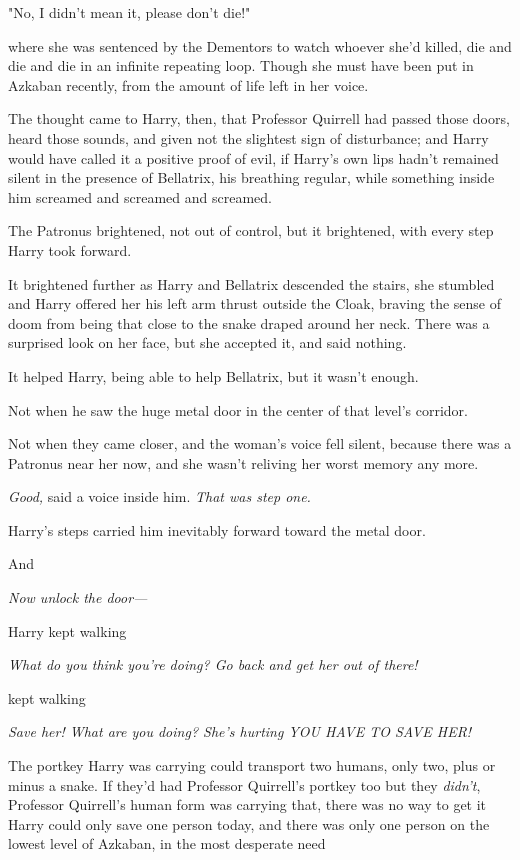 "No, I didn't mean it, please don't die!"

{\el} where she was sentenced by the Dementors to watch whoever she'd killed,
die and die and die in an infinite repeating loop. Though she must have been
put in Azkaban recently, from the amount of life left in her voice.

The thought came to Harry, then, that Professor Quirrell had passed those
doors, heard those sounds, and given not the slightest sign of disturbance; and
Harry would have called it a positive proof of evil, if Harry's own lips hadn't
remained silent in the presence of Bellatrix, his breathing regular, while
something inside him screamed and screamed and screamed.

The Patronus brightened, not out of control, but it brightened, with every step
Harry took forward.

It brightened further as Harry and Bellatrix descended the stairs, she stumbled
and Harry offered her his left arm thrust outside the Cloak, braving the sense
of doom from being that close to the snake draped around her neck. There was a
surprised look on her face, but she accepted it, and said nothing.

It helped Harry, being able to help Bellatrix, but it wasn't enough.

Not when he saw the huge metal door in the center of that level's corridor.

Not when they came closer, and the woman's voice fell silent, because there was
a Patronus near her now, and she wasn't reliving her worst memory any more.

\emph{Good,} said a voice inside him. \emph{That was step one.}

Harry's steps carried him inevitably forward toward the metal door.

And{\el}

\emph{Now unlock the door—}

{\el} Harry kept walking{\el}

\emph{What do you think you're doing? Go back and get her out of there!}

{\el} kept walking{\el}

\emph{Save her! What are you doing? She's hurting YOU HAVE TO SAVE HER!}

The portkey Harry was carrying could transport two humans, only two, plus or
minus a snake. If they'd had Professor Quirrell's portkey too{\el} but they
\emph{didn't}, Professor Quirrell's human form was carrying that, there was no
way to get it{\el} Harry could only save one person today, and there was
only one person on the lowest level of Azkaban, in the most desperate
need{\el}

